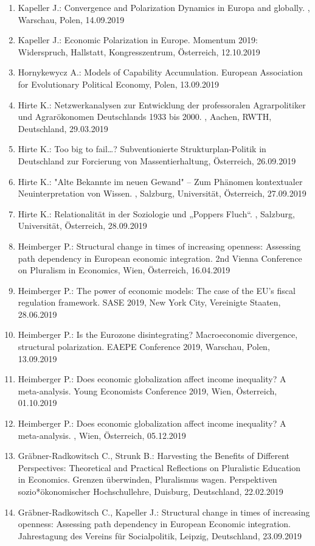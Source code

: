 \begin{enumerate}
	\item Kapeller J.: Convergence and Polarization Dynamics in Europa and globally. , Warschau, Polen, 14.09.2019
	\item Kapeller J.: Economic Polarization in Europe. Momentum 2019: Widerspruch, Hallstatt, Kongresszentrum, Österreich, 12.10.2019
	\item Hornykewycz A.: Models of Capability Accumulation. European Association for Evolutionary Political Economy, Polen, 13.09.2019
	\item Hirte K.: Netzwerkanalysen zur Entwicklung der professoralen Agrarpolitiker und Agrarökonomen Deutschlands 1933 bis 2000. , Aachen, RWTH, Deutschland, 29.03.2019
	\item Hirte K.: Too big to fail…? Subventionierte Strukturplan-Politik in Deutschland zur Forcierung von Massentierhaltung, Österreich, 26.09.2019
	\item Hirte K.: "Alte Bekannte im neuen Gewand" – Zum Phänomen kontextualer Neuinterpretation von Wissen. , Salzburg, Universität, Österreich, 27.09.2019
	\item Hirte K.: Relationalität in der Soziologie und „Poppers Fluch“. , Salzburg, Universität, Österreich, 28.09.2019
	\item Heimberger P.: Structural change in times of increasing openness: Assessing path dependency in European economic integration. 2nd Vienna Conference on Pluralism in Economics, Wien, Österreich, 16.04.2019
	\item Heimberger P.: The power of economic models: The case of the EU's fiscal regulation framework. SASE 2019, New York City, Vereinigte Staaten, 28.06.2019
	\item Heimberger P.: Is the Eurozone disintegrating? Macroeconomic divergence, structural polarization. EAEPE Conference 2019, Warschau, Polen, 13.09.2019
	\item Heimberger P.: Does economic globalization affect income inequality? A meta-analysis. Young Economists Conference 2019, Wien, Österreich, 01.10.2019
	\item Heimberger P.: Does economic globalization affect income inequality? A meta-analysis. , Wien, Österreich, 05.12.2019
	\item Gräbner-Radkowitsch C., Strunk B.: Harvesting the Benefits of Different Perspectives: Theoretical and Practical Reflections on Pluralistic Education in Economics. Grenzen überwinden, Pluralismus wagen. Perspektiven sozio*ökonomischer Hochschullehre, Duisburg, Deutschland, 22.02.2019
	\item Gräbner-Radkowitsch C., Kapeller J.: Structural change in times of increasing openness: Assessing path dependency in European Economic integration. Jahrestagung des Vereins für Socialpolitik, Leipzig, Deutschland, 23.09.2019

\end{enumerate}
